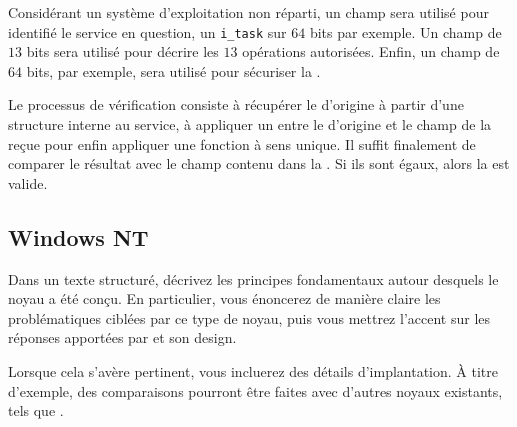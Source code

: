 \begin{correction}

Consid\'erant un syst\`eme d'exploitation non r\'eparti, un champ sera
utilis\'e pour identifi\'e le service en question, un \texttt{i\_task}
sur $64$ bits par exemple. Un champ de $13$ bits sera utilis\'e pour
d\'ecrire les $13$ op\'erations autoris\'ees. Enfin, un champ 
de $64$ bits, par exemple, sera utilis\'e pour s\'ecuriser la
.

Le processus de v\'erification consiste \`a r\'ecup\'erer le 
d'origine \`a partir d'une structure interne au service, \`a appliquer un
 entre le  d'origine et le champ 
de la  re\c{c}ue pour enfin appliquer une fonction
\`a sens unique. Il suffit finalement de comparer le r\'esultat avec le
champ  contenu dans la . Si ils sont
\'egaux, alors la  est valide.

\end{correction}

%
%
\subsection{Windows NT
            }

Dans un texte structur\'e, d\'ecrivez les principes fondamentaux autour
desquels le noyau  a \'et\'e con\c{c}u. En particulier, vous
\'enoncerez de mani\`ere claire les probl\'ematiques cibl\'ees par ce type de
noyau, puis vous mettrez l'accent sur les r\'eponses apport\'ees par 
et son design.

Lorsque cela s'av\`ere pertinent, vous incluerez des d\'etails d'implantation.
\`A titre d'exemple, des comparaisons pourront \^etre faites avec d'autres
noyaux existants, tels que .

